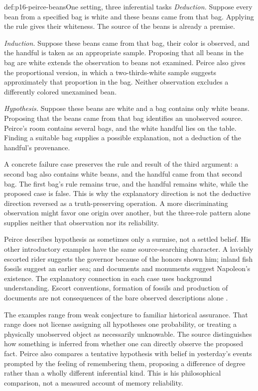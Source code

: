 \begin{hbexample}{def:p16-peirce-beans}{One setting, three inferential tasks}
\emph{Deduction.} Suppose every bean from a specified bag is white and
these beans came from that bag. Applying the rule gives their whiteness.
The source of the beans is already a premise.

\emph{Induction.} Suppose these beans came from that bag, their color is
observed, and the handful is taken as an appropriate sample. Proposing
that all beans in the bag are white extends the observation to beans
not examined. Peirce also gives the proportional version, in which a
two-thirds-white sample suggests approximately that proportion in the
bag. Neither observation excludes a differently colored unexamined bean.

\emph{Hypothesis.} Suppose these beans are white and a bag contains only
white beans. Proposing that the beans came from that bag identifies an
unobserved source. Peirce's room contains several bags, and the white
handful lies on the table. Finding a suitable bag supplies a possible
explanation, not a deduction of the handful's provenance.
\end{hbexample}

A concrete failure case preserves the rule and result of the third
argument: a second bag also contains white beans, and the handful came
from that second bag. The first bag's rule remains true, and the handful
remains white, while the proposed case is false. This is why the
explanatory direction is not the deductive direction reversed as a
truth-preserving operation. A more discriminating observation might
favor one origin over another, but the three-role pattern alone supplies
neither that observation nor its reliability.

Peirce describes hypothesis as sometimes only a surmise, not a settled
belief. His other introductory examples have the same source-searching
character. A lavishly escorted rider suggests the governor because of
the honors shown him; inland fish fossils suggest an earlier sea; and
documents and monuments suggest Napoleon's existence. The explanatory
connection in each case uses background understanding. Escort conventions,
formation of fossils and production of documents are not consequences
of the bare observed descriptions alone
\parencite[sec.~I]{Peirce1878DIHPrimary}.

The examples range from weak conjecture to familiar historical assurance.
That range does not license assigning all hypotheses one probability,
or treating a physically unobserved object as necessarily unknowable.
The source distinguishes how something is inferred from whether one
can directly observe the proposed fact. Peirce also compares a tentative
hypothesis with belief in yesterday's events prompted by the feeling of
remembering them, proposing a difference of degree rather than a wholly
different inferential kind. This is his philosophical comparison, not
a measured account of memory reliability.

